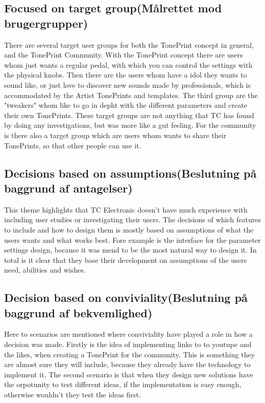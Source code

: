 \subsection*{Focused on target group(Målrettet mod brugergrupper)}
\label{ThemeFocusedOnTargetGroup}
There are several target user groups for both the TonePrint concept in general, and the TonePrint Community. With the TonePrint concept there are users whom just wants a regular pedal, with which you can control the settings with the physical knobs. Then there are the users whom have a idol they wants to sound like, or just love to discover new sounds made by professionals, which is accommodated by the Artist TonePrints and templates. The third group are the "tweakers" whom like to go in depht with the different parameters and create their own TonePrints. These target groups are not anything that TC has found by doing any investigations, but was more like a gut feeling. For the community is there also a target group which are users whom wants to share their TonePrints, so that other people can use it.

\subsection*{Decisions based on assumptions(Beslutning på baggrund af antagelser)} 
\label{ThemeDecisionsBasedOnAssumptions}
This theme highlights that TC Electronic doesn't have much experience with including user studies or investigating their users. The decisions of which features to include and how to design them is mostly based on assumptions of what the users wants and what works best. Fore example is the interface for the parameter settings design, because it was mend to be the most natural way to design it. In total is it clear that they base their development on assumptions of the users need, abilities and wishes.

\subsection*{Decision based on conviviality(Beslutning på baggrund af bekvemlighed)}
\label{DescisionBasedOnConviviality}
Here to scenarios are mentioned where conviviality have played a role in how a decision was made. Firstly is the idea of implementing links to to youtupe and the likes, when creating a TonePrint for the community. This is something they are almost sure they will include, because they already have the technology to implement it. The second scenario is that when they design new solutions have the orpotunity to test different ideas, if the implementation is easy enough, otherwise wouldn't they test the ideas first.

